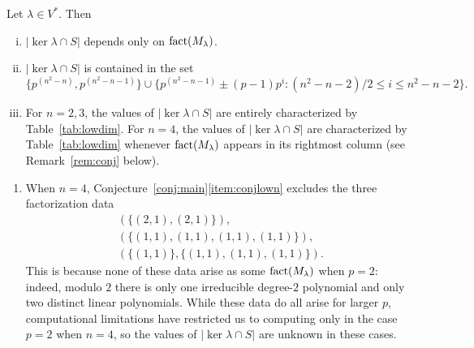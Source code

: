 \begin{conj}
\label{conj:main}
Let $\lambda\in V^*$. Then
\begin{enumerate}[(i)]
\item $|\ker\lambda\cap S|$ depends only on $\operatorname{fact}(M_\lambda)$.
\item $|\ker\lambda\cap S|$ is contained in the set
\begin{equation*}
\{p^{(n^2-n)},p^{(n^2-n-1)}\}\cup\{p^{(n^2-n-1)}\pm(p-1)p^i:(n^2-n-2)/2\le i\le n^2-n-2\}.
\end{equation*}
\item For $n=2,3$, the values of $|\ker\lambda\cap S|$ are entirely characterized by Table~\ref{tab:lowdim}. For $n=4$, the values of $|\ker\lambda\cap S|$ are characterized by Table~\ref{tab:lowdim} whenever $\operatorname{fact}(M_\lambda)$ appears in its rightmost column (see Remark~\ref{rem:conj} below).\label{item:conjlown}
\end{enumerate}
\end{conj}
\begin{rem}
\label{rem:conj}
\begin{enumerate}
\item When $n=4$, Conjecture~\ref{conj:main}\eqref{item:conjlown} excludes the three factorization data
\begin{gather*}
(\{(2,1),(2,1)\}),\\
(\{(1,1),(1,1),(1,1),(1,1)\}),\\
(\{(1,1)\},\{(1,1),(1,1),(1,1)\}).
\end{gather*}
This is because none of these data arise as some $\operatorname{fact}(M_\lambda)$ when $p=2$: indeed, modulo $2$ there is only one irreducible degree-$2$ polynomial and only two distinct linear polynomials. While these data do all arise for larger $p$, computational limitations have restricted us to computing only in the case $p=2$ when $n=4$, so the values of $|\ker\lambda\cap S|$ are unknown in these cases.
\end{enumerate}
\end{rem}

